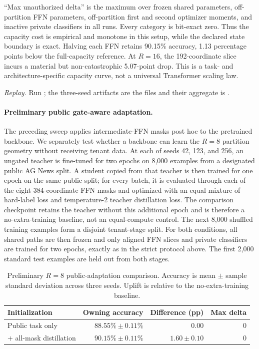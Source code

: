 \documentclass[11pt,a4paper]{article}
\begin{document}
``Max unauthorized delta'' is the maximum over frozen shared
parameters, off-partition FFN parameters, off-partition first and
second optimizer moments, and inactive private classifiers in all
runs.  Every category is bit-exact zero.  Thus the capacity cost is
empirical and monotone in this setup, while the declared state
boundary is exact.  Halving each FFN retains 90.15\% accuracy,
1.13 percentage points
below the full-capacity reference.  At $R{=}16$, the 192-coordinate
slice incurs a material but non-catastrophic 5.07-point drop.  This is
a task- and architecture-specific capacity curve, not a universal
Transformer scaling law.

\begin{sloppypar}
\noindent\textit{Replay.} Run
; the three-seed
artifacts are the
 files and their
aggregate is
.
\end{sloppypar}

\paragraph{Preliminary public gate-aware adaptation.}
The preceding sweep applies intermediate-FFN masks post hoc to the
pretrained backbone.  We separately test whether a backbone can learn
the $R{=}8$ partition geometry without receiving tenant data.  At each
of seeds 42, 123, and 256, an ungated teacher is fine-tuned for two
epochs on 8,000 examples from a designated public AG News split.  A
student copied from that teacher is then trained for one epoch on the
same public split; for every batch, it is evaluated through each of
the eight 384-coordinate FFN masks and optimized with an equal mixture
of hard-label loss and temperature-2 teacher distillation loss.
The comparison checkpoint retains the teacher without this additional
epoch and is therefore a no-extra-training baseline, not an
equal-compute control.  The next 8,000 shuffled training examples form a disjoint
tenant-stage split.  For both conditions, all shared paths are then
frozen and only aligned FFN slices and private classifiers are trained
for two epochs, exactly as in the strict protocol above.  The first
2,000 standard test examples are held out from both stages.

\begin{table}[ht]
\centering
\caption{Preliminary $R{=}8$ public-adaptation comparison.  Accuracy is
mean $\pm$ sample standard deviation across three seeds.  Uplift is
relative to the no-extra-training baseline.}
\label{tab:public-gate-adaptation}
\small
\begin{tabular}{@{}lrrr@{}}
\toprule
Initialization & Owning accuracy & Difference (pp) & Max delta \\
\midrule
Public task only & $88.55\%\pm0.11\%$ & 0.00 & 0 \\
$+$ all-mask distillation & $90.15\%\pm0.11\%$ &
$1.60\pm0.10$ & 0 \\
\bottomrule
\end{tabular}
\end{table}
\end{document}

